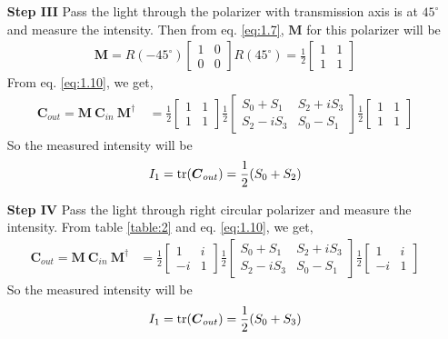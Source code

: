 \documentclass[11pt,a4paper]{article}
\numberwithin{equation}{section}
\begin{document}
\begin{enumerate}
\item[\textbf{Step III}] 
Pass the light through the polarizer with transmission axis is at $45^\circ$ and measure the intensity. Then from eq. \ref{eq:1.7}, $\boldsymbol{M}$ for this polarizer will be
\begin{align}
	\boldsymbol{M}= R(-45^\circ) \begin{bmatrix} 1 & 0 \\ 0 & 0 \end{bmatrix} R(45^\circ) =\frac{1}{2}\begin{bmatrix} 1 & 1 \\ 1 & 1 \end{bmatrix}
\end{align}
From eq. \ref{eq:1.10}, we get,
\begin{align}
	\boldsymbol{C}_{out} = \boldsymbol{M}\:\boldsymbol{C}_{in}\:\boldsymbol{M}^\dagger\
	&=\frac{1}{2}\begin{bmatrix} 1 & 1 \\ 1 & 1 \end{bmatrix} 
	\frac{1}{2} \begin{bmatrix} S_0+S_1 & S_2+iS_3 \\ S_2-iS_3 & S_0-S_1\end{bmatrix}
	\frac{1}{2}\begin{bmatrix} 1 & 1 \\ 1 & 1 \end{bmatrix}
\end{align}
So the measured intensity will be 
\begin{align}
	I_1 = \tr(\boldsymbol{C}_{out}) = \frac{1}{2} (S_0+S_2) \label{s III}
\end{align}
 
  \item[\textbf{Step IV}] 
 Pass the light through right circular polarizer and measure the intensity. From table \ref{table:2} and eq. \ref{eq:1.10}, we get,
 \begin{align}
 	\boldsymbol{C}_{out} = \boldsymbol{M}\:\boldsymbol{C}_{in}\:\boldsymbol{M}^\dagger
 	&=\frac{1}{2}\begin{bmatrix} 1 & i \\ -i & 1 \end{bmatrix} 
 	\frac{1}{2} \begin{bmatrix} S_0+S_1 & S_2+iS_3 \\ S_2-iS_3 & S_0-S_1\end{bmatrix}
 	\frac{1}{2}\begin{bmatrix} 1 & i \\ -i & 1 \end{bmatrix}
 \end{align}
 So the measured intensity will be 
 \begin{align}
 	I_1 = \tr(\boldsymbol{C}_{out}) = \frac{1}{2} (S_0+S_3) \label{s IV}
 \end{align}
 \end{enumerate}
\end{document}
